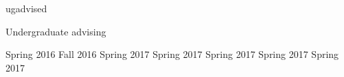 
\if ugadvised
\begin{category}{Undergraduate advising}

   Spring 2016
   Fall 2016
   Spring 2017
    Spring 2017
   Spring 2017
   Spring 2017
   Spring 2017

\end{category}
\fi
